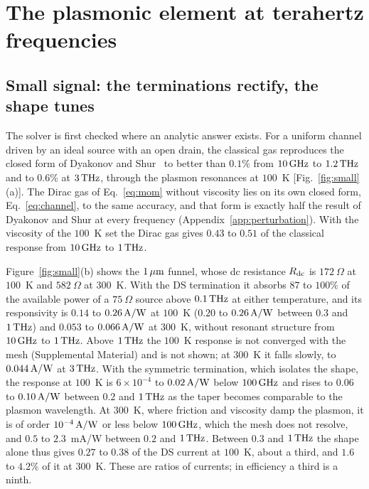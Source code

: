 \section{The plasmonic element at terahertz frequencies}
\label{sec:plasmonic}

\subsection{Small signal: the terminations rectify, the shape tunes}
\label{sec:small}

The solver is first checked where an analytic answer exists. For a uniform
channel driven by an ideal source with an open drain, the classical gas
reproduces the closed form of Dyakonov and
Shur~\cite{dyakonov1996detection} to better than $0.1\%$ from $10\,\mathrm{GHz}$ to
$1.2\,\mathrm{THz}$ and to $0.6\%$ at $3\,\mathrm{THz}$, through the plasmon resonances at
$100$~K [Fig.~\ref{fig:small}(a)]. The Dirac gas of Eq.~\eqref{eq:mom}
without viscosity lies on its own closed form, Eq.~\eqref{eq:channel}, to
the same accuracy, and that form is exactly half the result of Dyakonov
and Shur at every frequency (Appendix~\ref{app:perturbation}). With the
viscosity of the $100$~K set the Dirac gas gives $0.43$ to $0.51$ of the
classical response from $10\,\mathrm{GHz}$ to $1\,\mathrm{THz}$.

Figure~\ref{fig:small}(b) shows the $1\,\mu\mathrm{m}$ funnel, whose dc resistance
$R_{\mathrm{dc}}$ is $172\ \Omega$ at $100$~K and $582\ \Omega$ at $300$~K. With the
DS termination it absorbs $87$ to $100\%$ of the available power of a
$75\ \Omega$ source above $0.1\,\mathrm{THz}$ at either temperature, and its
responsivity is $0.14$ to $0.26\,\mathrm{A/W}$ at $100$~K ($0.20$ to $0.26\,\mathrm{A/W}$
between $0.3$ and $1\,\mathrm{THz}$) and $0.053$ to $0.066\,\mathrm{A/W}$ at $300$~K, without
resonant structure from $10\,\mathrm{GHz}$ to $1\,\mathrm{THz}$. Above $1\,\mathrm{THz}$ the $100$~K
response is not converged with the mesh (Supplemental Material) and is
not shown; at $300$~K it falls slowly, to $0.044\,\mathrm{A/W}$ at $3\,\mathrm{THz}$. With the
symmetric termination, which isolates the shape, the response at $100$~K
is $6\times10^{-4}$ to $0.02\,\mathrm{A/W}$ below $100\,\mathrm{GHz}$ and rises to $0.06$ to
$0.10\,\mathrm{A/W}$ between $0.2$ and $1\,\mathrm{THz}$ as the taper becomes comparable to the
plasmon wavelength. At $300$~K, where friction and viscosity damp the
plasmon, it is of order $10^{-4}\,\mathrm{A/W}$ or less below $100\,\mathrm{GHz}$, which the
mesh does not resolve, and $0.5$ to $2.3$~mA/W between $0.2$ and $1\,\mathrm{THz}$.
Between $0.3$ and $1\,\mathrm{THz}$ the shape alone thus gives $0.27$ to $0.38$ of
the DS current at $100$~K, about a third, and $1.6$ to $4.2\%$ of it at
$300$~K. These are ratios of currents; in efficiency a third is a ninth.


